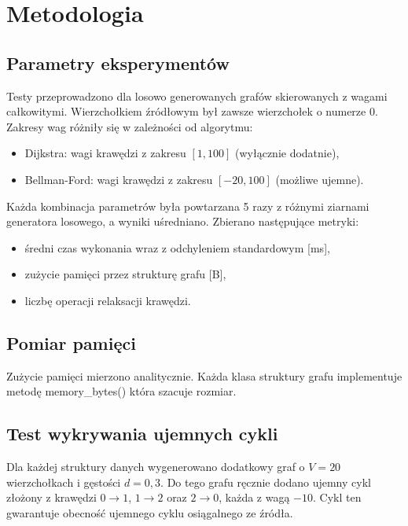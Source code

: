 \documentclass[12pt,a4paper]{article}
\begin{document}
\section{Metodologia}

\subsection{Parametry eksperymentów}

Testy przeprowadzono dla losowo generowanych grafów skierowanych z wagami całkowitymi. Wierzchołkiem źródłowym był zawsze wierzchołek o numerze $0$. Zakresy wag różniły się w zależności od algorytmu:

\begin{itemize}
    \item Dijkstra: wagi krawędzi z zakresu $[1, 100]$ (wyłącznie dodatnie),
    \item Bellman-Ford: wagi krawędzi z zakresu $[-20, 100]$ (możliwe ujemne).
\end{itemize}

Każda kombinacja parametrów była powtarzana 5 razy z różnymi ziarnami generatora losowego, a wyniki uśredniano. Zbierano następujące metryki:
\begin{itemize}
    \item średni czas wykonania wraz z odchyleniem standardowym [ms],
    \item zużycie pamięci przez strukturę grafu [B],
    \item liczbę operacji relaksacji krawędzi.
\end{itemize}

\subsection{Pomiar pamięci}

Zużycie pamięci mierzono analitycznie. Każda klasa struktury grafu implementuje metodę memory\_bytes() która szacuje rozmiar.

\subsection{Test wykrywania ujemnych cykli}

Dla każdej struktury danych wygenerowano dodatkowy graf o $V = 20$ wierzchołkach i gęstości $d = 0{,}3$. Do tego grafu ręcznie dodano ujemny cykl złożony z krawędzi $0 \to 1$, $1 \to 2$ oraz $2 \to 0$, każda z wagą $-10$. Cykl ten gwarantuje obecność ujemnego cyklu osiągalnego ze źródła.
\end{document}
